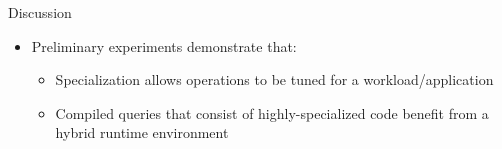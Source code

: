 \begin{block}{Discussion}

  \begin{itemize}
  \item Preliminary experiments demonstrate that:
    \begin{itemize}
    \item Specialization allows operations to be tuned for a workload/application
    \item Compiled queries that consist of highly-specialized code benefit from a hybrid runtime environment
    \end{itemize}
  \end{itemize}


\end{block}
